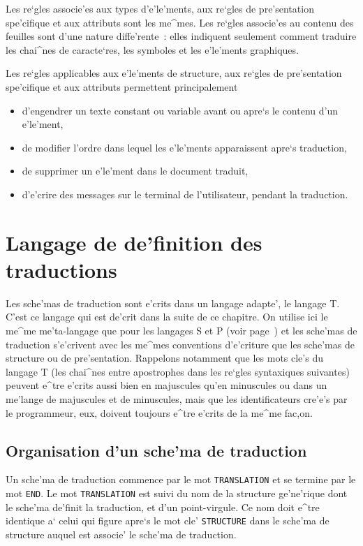 {Les re`gles associe'es aux types d'e'le'ments,
aux re`gles de pre'sentation spe'cifique
et aux attributs sont les me^mes.
Les re`gles associe'es au contenu des feuilles sont d'une nature diffe'rente~:
elles indiquent seulement comment traduire les chai^nes de caracte`res, les
symboles et les e'le'ments graphiques.

Les re`gles applicables aux e'le'ments de structure,
aux re`gles de pre'sentation spe'cifique
et aux attributs permettent principalement
\begin{itemize}
\item d'engendrer un texte constant ou variable avant ou apre`s le contenu
d'un e'le'ment,
\item de modifier l'ordre dans lequel les e'le'ments apparaissent apre`s
traduction,
\item de supprimer un e'le'ment dans le document traduit,
\item d'e'crire des messages sur le terminal de l'utilisateur, pendant la
traduction.
\end{itemize}

\section{Langage de de'finition des traductions}

Les sche'mas de traduction sont e'crits dans un langage adapte', le langage T.
C'est ce langage qui est de'crit dans la suite de ce chapitre. On utilise ici
le me^me me'ta-langage que pour les langages S et P (voir
page~\pageref{metalang}) et les sche'mas de traduction s'e'crivent avec les
me^mes conventions d'e'criture que les sche'mas de structure ou de
pre'sentation. Rappelons notamment que les mots cle's du langage T
(les chai^nes entre apostrophes dans les re`gles syntaxiques suivantes)
peuvent e^tre e'crits aussi bien en majuscules qu'en minuscules ou dans un
me'lange de majuscules et de minuscules, mais que les identificateurs cre'e's
par le programmeur, eux, doivent toujours e^tre e'crits de la me^me fac,on.

\subsection{Organisation d'un sche'ma de traduction}

Un sche'ma de traduction commence par le mot {\tt TRANSLATION} et se termine
par le mot {\tt END}. Le mot {\tt TRANSLATION} est suivi du nom de la
structure ge'ne'rique dont le sche'ma de'finit la traduction, et d'un
point-virgule. Ce nom doit e^tre identique a` celui qui figure apre`s le
mot cle' {\tt STRUCTURE} dans le sche'ma de structure auquel est associe' le
sche'ma de traduction.

}
